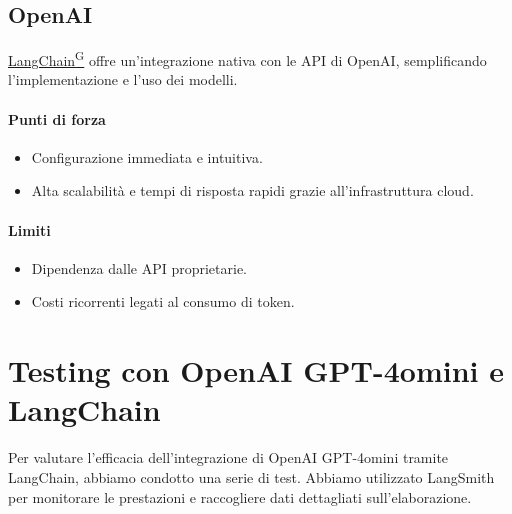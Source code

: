 \documentclass{article}
\begin{document}
\subsection{OpenAI}
\href{https://code7crusaders.github.io/docs/RTB/documentazione_interna/glossario.html#langchain}{LangChain\textsuperscript{G}} offre un'integrazione nativa con le API di OpenAI, semplificando l'implementazione e l'uso dei modelli.

\paragraph*{Punti di forza}
\begin{itemize}
    \item Configurazione immediata e intuitiva.
    \item Alta scalabilità e tempi di risposta rapidi grazie all'infrastruttura cloud.
\end{itemize}

\paragraph*{Limiti}
\begin{itemize}
    \item Dipendenza dalle API proprietarie.
    \item Costi ricorrenti legati al consumo di token.
\end{itemize}


\section{Testing con OpenAI GPT-4omini e LangChain}
Per valutare l'efficacia dell'integrazione di OpenAI GPT-4omini tramite LangChain, abbiamo condotto una serie di test. Abbiamo utilizzato LangSmith per monitorare le prestazioni e raccogliere dati dettagliati sull'elaborazione.
\end{document}
